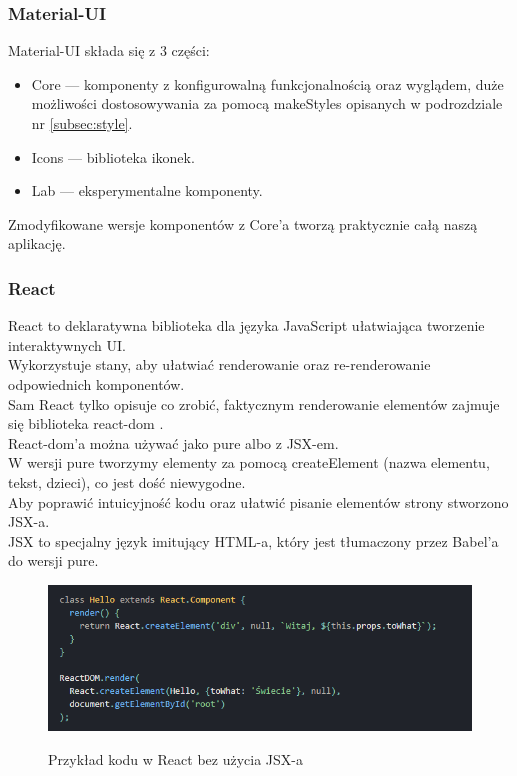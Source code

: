\documentclass[a4paper,11pt]{report}
\begin{document}
\subsubsection{Material-UI}
\label{subsec:mui}
Material-UI\cite{material-ui} składa się z 3 części:
\begin{itemize}
	\item Core — komponenty z konfigurowalną funkcjonalnością oraz wyglądem,
		duże możliwości dostosowywania za pomocą makeStyles opisanych w podrozdziale nr \ref{subsec:style}.
	\item Icons — biblioteka ikonek.
	\item Lab — eksperymentalne komponenty.
\end{itemize}
Zmodyfikowane wersje komponentów z Core'a tworzą praktycznie całą naszą aplikację.

\subsubsection{React}
\label{subsec:react}
React\cite{react} to deklaratywna biblioteka dla języka JavaScript ułatwiająca tworzenie interaktywnych UI.\\
 Wykorzystuje stany, aby ułatwiać renderowanie oraz re-renderowanie odpowiednich komponentów.\\
 Sam React tylko opisuje co zrobić, faktycznym renderowanie elementów zajmuje się biblioteka react-dom \cite{react-dom}.\\
 React-dom'a można używać jako pure albo z JSX-em.\\
 W wersji pure tworzymy elementy za pomocą createElement (nazwa elementu, tekst, dzieci), co jest dość niewygodne.\\
 Aby poprawić intuicyjność kodu oraz ułatwić pisanie elementów strony stworzono JSX-a.\\
 JSX to specjalny język imitujący HTML-a, który jest tłumaczony przez Babel'a do wersji pure.\\
 \begin{figure}[H]
	\centering
	\includegraphics[scale=0.5]{implementacja/frontend/react_no_jsx}\\
	\caption{Przykład kodu w React bez użycia JSX-a}
	\label{fig:react_no_jsx}
\end{figure}
\end{document}
